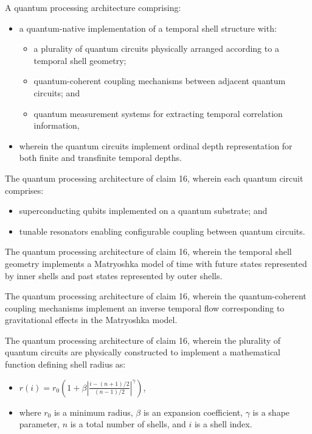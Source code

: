 \documentclass[12pt,letterpaper]{article}
\begin{document}
\begin{patentclaims}
    \item A quantum processing architecture comprising:
    \begin{itemize}[leftmargin=2em]
        \item a quantum-native implementation of a temporal shell structure with:
        \begin{itemize}
            \item a plurality of quantum circuits physically arranged according to a temporal shell geometry;
            \item quantum-coherent coupling mechanisms between adjacent quantum circuits; and
            \item quantum measurement systems for extracting temporal correlation information,
        \end{itemize}
        \item wherein the quantum circuits implement ordinal depth representation for both finite and transfinite temporal depths.
    \end{itemize}
    
    \item The quantum processing architecture of claim 16, wherein each quantum circuit comprises:
    \begin{itemize}[leftmargin=2em]
        \item superconducting qubits implemented on a quantum substrate; and
        \item tunable resonators enabling configurable coupling between quantum circuits.
    \end{itemize}
    
    \item The quantum processing architecture of claim 16, wherein the temporal shell geometry implements a Matryoshka model of time with future states represented by inner shells and past states represented by outer shells.
    
    \item The quantum processing architecture of claim 16, wherein the quantum-coherent coupling mechanisms implement an inverse temporal flow corresponding to gravitational effects in the Matryoshka model.
    
    \item The quantum processing architecture of claim 16, wherein the plurality of quantum circuits are physically constructed to implement a mathematical function defining shell radius as:
    \begin{itemize}[leftmargin=2em]
        \item $r(i) = r_0 \left(1 + \beta \left|\frac{i - (n+1)/2}{(n-1)/2}\right|^\gamma\right)$,
        \item where $r_0$ is a minimum radius, $\beta$ is an expansion coefficient, $\gamma$ is a shape parameter, $n$ is a total number of shells, and $i$ is a shell index.
    \end{itemize}
\end{patentclaims}
\end{document}
